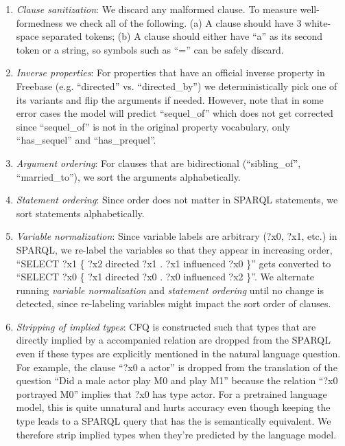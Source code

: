 \documentclass{article} \usepackage{iclr2022_conference,times}
\begin{document}
\begin{enumerate}
    \item \textit{Clause sanitization}: We discard any malformed clause. To measure well-formedness we check all of the following. (a) A clause should have 3 white-space separated tokens; (b) A clause should either have ``a'' as its second token or a string, so symbols such as ``='' can be safely discard.
    \item \textit{Inverse properties}: For properties that have an official inverse property in Freebase (e.g. ``directed'' vs. ``directed\_by'') we deterministically pick one of its variants and flip the arguments if needed. However, note that in some error cases the model will predict ``sequel\_of'' which does not get corrected since ``sequel\_of'' is not in the original property vocabulary, only ``has\_sequel'' and ``has\_prequel''.
    \item \textit{Argument ordering}: For clauses that are bidirectional (``sibling\_of'', ``married\_to''), we sort the arguments alphabetically.
    \item \textit{Statement ordering}: Since order does not matter in SPARQL statements, we sort statements alphabetically.
    \item \textit{Variable normalization}: Since variable labels are arbitrary (?x0, ?x1, etc.) in SPARQL, we re-label the variables so that they appear in increasing order, ``SELECT ?x1 \{ ?x2 directed ?x1 . ?x1 influenced ?x0 \}'' gets converted to ``SELECT ?x0 \{ ?x1 directed ?x0 . ?x0 influenced ?x2 \}''. We alternate running \textit{variable normalization} and \textit{statement ordering} until no change is detected, since re-labeling variables might impact the sort order of clauses.
    \item \textit{Stripping of implied types}: CFQ is constructed such that types that are directly implied by a accompanied relation are dropped from the SPARQL even if these types are explicitly mentioned in the natural language question. For example, the clause ``?x0 a actor'' is dropped from the translation of the question ``Did a male actor play M0 and play M1'' because the relation ``?x0 portrayed M0'' implies that ?x0 has type actor. For a pretrained language model, this is quite unnatural and hurts accuracy even though keeping the type leads to a SPARQL query that has the is semantically equivalent. We therefore strip implied types when they're predicted by the language model.
\end{enumerate}
\end{document}

